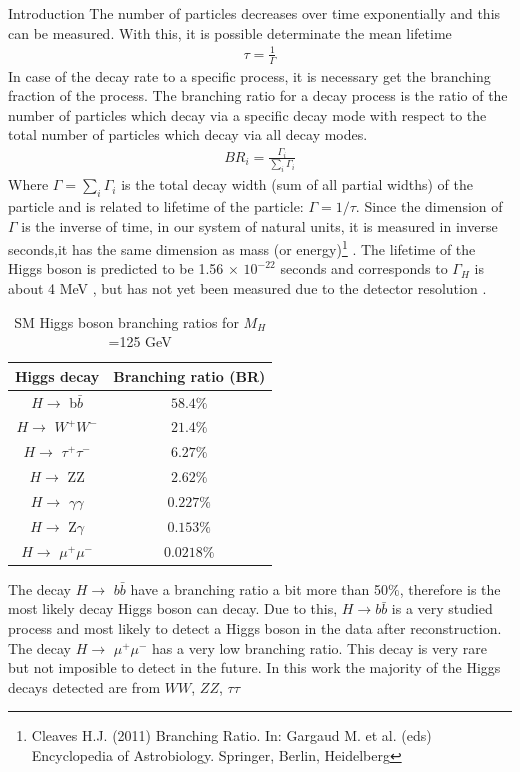 \begin{chapter}{Introduction}
The number of particles decreases over time exponentially and this can be measured. With this, it is possible determinate the mean lifetime\cite{griff}
\begin{align}
\tau=\frac{1}{\Gamma}
\end{align}
In case of  the decay rate to a specific process, it is necessary get the branching fraction of the process. 
The branching ratio for a decay process is the ratio of the number of particles which decay via a specific decay mode with respect to the total number of particles which decay via all decay modes.
\begin{align}
BR_i =\frac{\Gamma_i}{\sum_{i}\Gamma_i}
\end{align}
Where $\Gamma=\sum_i\Gamma_i$ is the total decay width (sum of all partial widths) of the particle and is related to lifetime of the particle: $\Gamma=1/\tau$.
Since the dimension of $\Gamma$ is the inverse of time, in our system of natural units, it is measured in inverse seconds,it has the same dimension as mass (or energy)\footnote{Cleaves H.J. (2011) Branching Ratio. In: Gargaud M. et al. (eds) Encyclopedia of Astrobiology. Springer, Berlin, Heidelberg} . The lifetime of the Higgs boson is predicted to be 1.56 $\times$ $10^{-22}$ seconds and corresponds to $\Gamma_H$ is about 4 MeV , but has not yet been measured due to the detector resolution \cite{cms-manual}.
\\
\begin{table}[!htbp] 
\caption{SM Higgs boson branching ratios for  $M_H$ =125 GeV \protect \cite{pd}}
\centering
\begin{tabular}{|c|c|}
\hline
Higgs decay & Branching ratio (BR)\\
\hline
$H \rightarrow$ b$\bar{b}$ &$58.4\%$ \\
\hline
 $H \rightarrow$ $W^+W^-$ &$21.4\%$ \\
\hline
$H \rightarrow$ $\tau^+ \tau^-$ & $6.27\%$\\
\hline
$H \rightarrow$ ZZ &$2.62\%$\\
\hline
$H \rightarrow$ $\gamma\gamma$ &$0.227\%$\\
\hline
$H \rightarrow$ Z$\gamma$ &$0.153\%$\\
\hline
$H \rightarrow$ $\mu^+\mu^-$ &$0.0218\%$\\
\hline
\end{tabular}
\label{higgs1}
\end{table}
The decay  $H \rightarrow$ $b\bar{b}$ have a branching ratio a bit more than 50$\%$, therefore is the most likely decay Higgs boson can decay. Due to this,  $H\rightarrow b\bar{b}$ is a very studied process and most likely to detect a Higgs boson in the data after reconstruction. The decay  $H \rightarrow$ $\mu^+\mu^-$ has a very low branching ratio. This decay is very rare but not imposible to detect in the future.  In this work the majority of the Higgs decays detected are from $WW$, $ZZ$, $\tau \tau$\\


\end{chapter}
